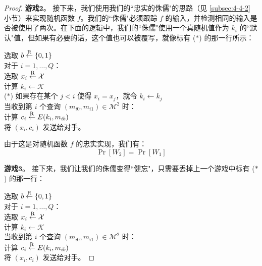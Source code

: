 \begin{proof}
\vspace{5pt}

\noindent\textbf{游戏$\mathbf{2}$}。
接下来，我们使用我们的``忠实的侏儒"的思路（见 \ref{subsec:4-4-2} 小节）来实现随机函数 $f$。我们的``侏儒"必须跟踪 $f$ 的输入，并检测相同的输入是否被使用了两次。在下面的逻辑中，我们的``侏儒"使用一个真随机值作为 $k_i$ 的``默认"值，但如果有必要的话，这个值也可以被覆写，就像标有 ($*$) 的那一行所示：

\vspace{5pt}

\hspace*{5pt} 选取 $b\overset{\rm R}\leftarrow\{0,1\}$\\
\hspace*{26pt} 对于 $i=1,\dots,Q$：\\
\hspace*{50pt} 选取 $x_i\overset{\rm R}\leftarrow\mathcal{X}$\\
\hspace*{50pt} 计算 $k_i\leftarrow\mathcal{K}$\\
\hspace*{3pt} ($*$)
\hspace*{26.5pt} 如果存在某个 $j<i$ 使得 $x_i=x_j$，就令 $k_i\leftarrow k_j$\\
\hspace*{26pt} 当收到第 $i$ 个查询 $(m_{i0},m_{i1})\in\mathcal{M}^2$ 时：\\
\hspace*{50pt} 计算 $c_i\overset{\rm R}\leftarrow E(k_i,m_{ib})$\\
\hspace*{50pt} 将 $(x_i,c_i)$ 发送给对手。

\vspace{5pt}

\noindent
由于这是对随机函数 $f$ 的忠实实现，我们有：
\begin{equation}\label{eq:5-9}
\Pr[W_2]=\Pr[W_1]
\end{equation}

\noindent\textbf{游戏$\mathbf{3}$}。
接下来，我们让我们的侏儒变得``健忘"，只需要丢掉上一个游戏中标有 ($*$) 的那一行：

\vspace{5pt}

\hspace*{5pt} 选取 $b\overset{\rm R}\leftarrow\{0,1\}$\\
\hspace*{26pt} 对于 $i=1,\dots,Q$：\\
\hspace*{50pt} 选取 $x_i\overset{\rm R}\leftarrow\mathcal{X}$\\
\hspace*{50pt} 计算 $k_i\leftarrow\mathcal{K}$\\
\hspace*{26pt} 当收到第 $i$ 个查询 $(m_{i0},m_{i1})\in\mathcal{M}^2$ 时：\\
\hspace*{50pt} 计算 $c_i\overset{\rm R}\leftarrow E(k_i,m_{ib})$\\
\hspace*{50pt} 将 $(x_i,c_i)$ 发送给对手。


\end{proof}
